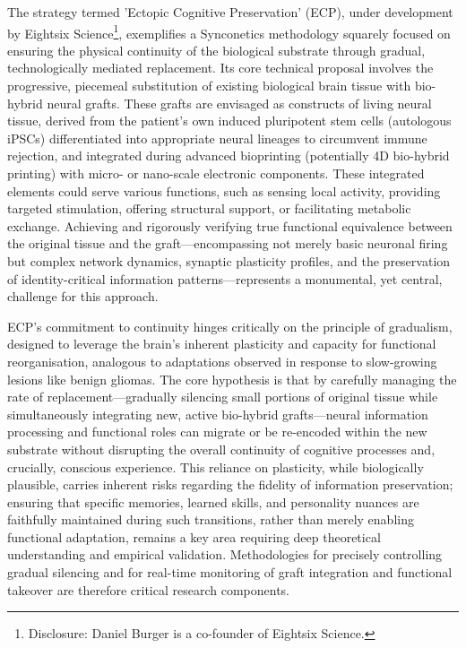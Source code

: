 \documentclass[10pt]{article}
\begin{document}
\begin{sloppypar}
  The strategy termed 'Ectopic Cognitive Preservation' (ECP), under development by Eightsix Science\footnote{Disclosure: Daniel Burger is a co-founder of Eightsix Science.}, exemplifies a Synconetics methodology squarely focused on ensuring the physical continuity of the biological substrate through gradual, technologically mediated replacement. Its core technical proposal involves the progressive, piecemeal substitution of existing biological brain tissue with bio-hybrid neural grafts. These grafts are envisaged as constructs of living neural tissue, derived from the patient's own induced pluripotent stem cells (autologous iPSCs) differentiated into appropriate neural lineages to circumvent immune rejection, and integrated during advanced bioprinting (potentially 4D bio-hybrid printing) with micro- or nano-scale electronic components. These integrated elements could serve various functions, such as sensing local activity, providing targeted stimulation, offering structural support, or facilitating metabolic exchange. Achieving and rigorously verifying true functional equivalence between the original tissue and the graft—encompassing not merely basic neuronal firing but complex network dynamics, synaptic plasticity profiles, and the preservation of identity-critical information patterns—represents a monumental, yet central, challenge for this approach.

  ECP's commitment to continuity hinges critically on the principle of gradualism, designed to leverage the brain's inherent plasticity and capacity for functional reorganisation, analogous to adaptations observed in response to slow-growing lesions like benign gliomas. The core hypothesis is that by carefully managing the rate of replacement—gradually silencing small portions of original tissue while simultaneously integrating new, active bio-hybrid grafts—neural information processing and functional roles can migrate or be re-encoded within the new substrate without disrupting the overall continuity of cognitive processes and, crucially, conscious experience. This reliance on plasticity, while biologically plausible, carries inherent risks regarding the fidelity of information preservation; ensuring that specific memories, learned skills, and personality nuances are faithfully maintained during such transitions, rather than merely enabling functional adaptation, remains a key area requiring deep theoretical understanding and empirical validation. Methodologies for precisely controlling gradual silencing and for real-time monitoring of graft integration and functional takeover are therefore critical research components.


\end{sloppypar}
\end{document}
